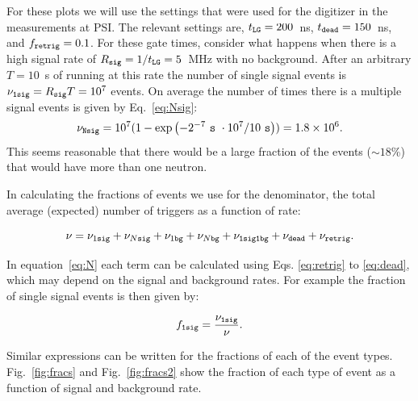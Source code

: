 \documentclass[letter,twocolumn,preprint,3p,numbers,sort&compress]{elsarticle}
\begin{document}
For these plots we will use the settings that were used for the
digitizer in the measurements at PSI.  The relevant settings are,
$t_{\tt LG}=200$~ns, $t_{\tt dead}=150$~ns, and $f_{\tt retrig}=0.1$.
For these gate times, consider what happens when there is a high
signal rate of $R_{\tt sig} = 1/t_{\tt LG} = 5$~MHz with no
background.  After an arbitrary $T=10$~s of running at this rate the
number of single signal events is $\nu_{\tt 1 sig} = R_{\tt sig} T =
10^7$ events.  On average the number of times there is a multiple
signal events is given by Eq.~\ref{eq:Nsig}:
\begin{equation}
\nu_{\tt N sig} = 10^7 ( 1 - \exp{ \left( -2^{-7}\ {\tt s}\ \cdot 10^7  / 10\ {\tt s} \right) } ) = 1.8\times10^6. 
\end{equation}
This seems reasonable that there would be a large fraction of the
events ($\sim 18$\%) that would have more than one neutron.

In calculating the fractions of events we use for the denominator, the
total average (expected) number of triggers as a function of rate:

\begin{equation}\label{eq:N}
\nu = \nu_{1\tt sig} + \nu_{N\tt sig} + \nu_{1\tt bg} + \nu_{N\tt bg} + \nu_{\tt 1 sig 1 bg} + \nu_{\tt dead} + \nu_{\tt retrig}.
\end{equation}

In equation~\ref{eq:N} each term can be calculated using
Eqs. \ref{eq:retrig} to \ref{eq:dead}, which may depend on the signal
and background rates.  For example the fraction of single signal
events is then given by:

\begin{equation}
f_{\tt 1 sig } = \frac{ \nu_{\tt 1 sig} }{ \nu }.
\end{equation}

Similar expressions can be written for the fractions of each of the
event types.  Fig.~\ref{fig:fracs} and Fig.~\ref{fig:fracs2} show the
fraction of each type of event as a function of signal and background
rate.
\end{document}
